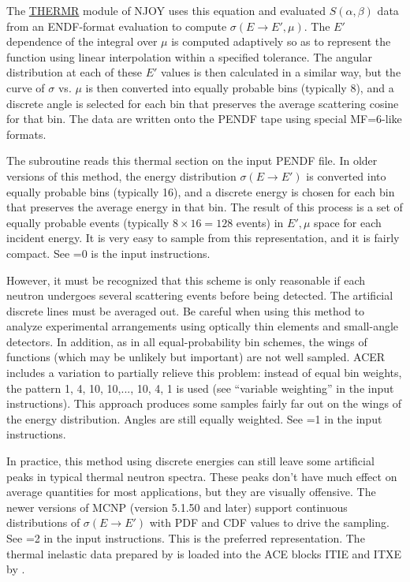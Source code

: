 The \hyperlink{sTHERMRhy}{THERMR}
module of NJOY uses this equation and evaluated
$S(\alpha,\beta)$ data from an ENDF-format
evaluation to compute $\sigma(E{\rightarrow}E',\mu)$.  The $E'$ dependence
of the integral over $\mu$ is computed adaptively so as to
represent the function using linear interpolation within a
specified tolerance.  The angular distribution at each of
these $E'$ values is then calculated in a similar way, but
the curve of $\sigma$ vs. $\mu$ is then converted into
equally probable bins (typically 8), and a discrete angle is
selected for each bin that preserves the average scattering
cosine for that bin.  The data are written onto the PENDF
tape using special MF=6-like formats.

The  subroutine reads this
thermal section on the input PENDF file.  In older
versions of this method, the energy distribution
$\sigma(E\rightarrow E')$ is converted into equally probable bins
(typically 16), and a discrete energy is chosen for each bin that
preserves the average energy in that bin.  The result of this process
is a set of equally probable events
(typically $8\times 16=128$ events) in $E',\mu$ space for each
incident energy.  It is very easy to sample from this representation,
and it is fairly compact.  See =0 is the input
instructions.

However, it must be recognized that this scheme is only reasonable
if each neutron undergoes several scattering events before being
detected.  The artificial discrete lines must be averaged out.  Be
careful when using this method to analyze experimental arrangements
using optically thin elements and small-angle detectors.  In addition,
as in all equal-probability bin schemes, the wings of functions
(which may be unlikely but important) are not well sampled.  ACER
includes a variation to partially relieve this problem: instead of
equal bin weights, the pattern 1, 4, 10, 10,..., 10, 4, 1 is used
(see ``variable weighting'' in the input instructions).  This approach
produces some samples fairly far out on the wings of the energy
distribution.  Angles are still equally weighted.  See =1
in the input instructions.

In practice, this method using discrete energies can still leave
some artificial peaks in typical thermal neutron spectra.  These
peaks don't have much effect on average quantities for most
applications, but they are visually offensive.  The newer versions
of MCNP (version 5.1.50 and later) support continuous distributions
of $\sigma(E\rightarrow E')$ with PDF and CDF values to drive the
sampling.  See =2 in the input instructions.  This is
the preferred representation.  The thermal inelastic data prepared by
 is loaded into the ACE blocks
ITIE and ITXE by .

